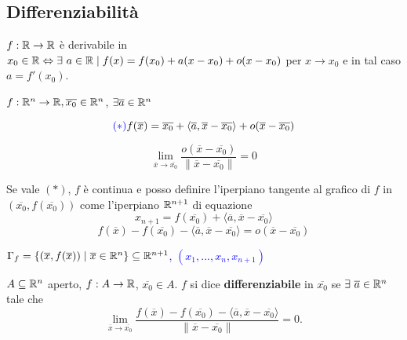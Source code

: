 \subsection{Differenziabilità}

$f:\mathbb{R}\rightarrow\mathbb{R}$ è derivabile in $x_0\in \mathbb{R} \Leftrightarrow \exists \,\, a \in \mathbb{R} \mid f(x)=f(x_0)+a(x-x_0)+o(x-x_0)$ per $x \rightarrow x_0$ e in tal caso $a=f'(x_0)$.

$f:\mathbb{R}^n\rightarrow\mathbb{R}, \overline{x_0}\in\mathbb{R}^n$, $\exists\overline{a}\in\mathbb{R}^n$

$${\color{blue} (*)}f(\overline{x})=\overline{x_0}+ \langle \overline{a},\overline{x}-\overline{x_0} \rangle +o(\overline{x}-\overline{x_0})$$

$$\lim_{\overline{x}\rightarrow\overline{x_0}}\frac{o(\overline{x}-\overline{x_0})}{\|\overline{x}-\overline{x_0}\|}=0$$

Se vale {\color{blue}$(*)$}, $f$ è continua e posso definire l'iperpiano tangente al grafico di $f$ in $(\overline{x_0},f(\overline{x_0}))$ come l'iperpiano $\mathbb{R}^{n+1}$ di equazione
\begin{equation*}
	x_{n+1}=f(\overline{x_0})+\langle \overline{a},\overline{x}-\overline{x_0}\rangle
\end{equation*}
\begin{equation*}
	f(\overline{x})-f(\overline{x_0})-\langle \overline{a},\overline{x}-\overline{x_0} \rangle=o(\overline{x}-\overline{x_0})
\end{equation*}

\textcolor{blue}{$\Gamma_f=\{(\overline{x},f(\overline{x}))\mid \overline{x} \in \mathbb{R}^n\}\subseteq\mathbb{R}^{n+1}$, $(x_1,...,x_n,x_{n+1})$}


\begin{definition}
	$A\subseteq\mathbb{R}^n$ aperto, $f:A\rightarrow \mathbb{R}$, $\overline{x_0}\in A$. $f$ si dice \textbf{differenziabile} in $\overline{x_0}$ se $\exists\,\, \overline{a}\in \mathbb{R}^n$ tale che
	\begin{equation*}
		\lim_{\overline{x}\rightarrow\overline{x_0}}\frac{f(\overline{x})-f(\overline{x_0})-\langle \overline{a},\overline{x}-\overline{x_0}\rangle}{\|\overline{x}-\overline{x_0}\|}=0.
	\end{equation*}
\end{definition}


